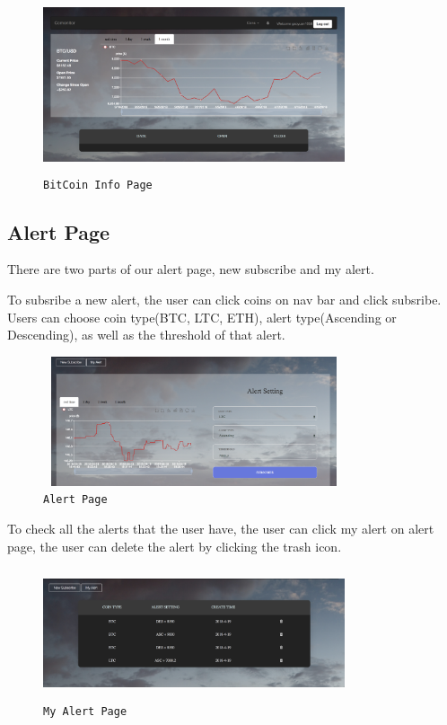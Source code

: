 \begin{figure}[!htb]
\includegraphics[height=2.0in, width=3.5in]{coinpage.png}
\caption{\texttt{BitCoin Info Page}}
\end{figure}

\subsection{Alert Page}
There are two parts of our alert page, new subscribe and my alert.

To subsribe a new alert, the user can click coins on nav bar and click subsribe. Users
can choose coin type(BTC, LTC, ETH), alert type(Ascending or Descending), as well as the 
threshold of that alert.

\begin{figure}[!htb]
\includegraphics[height=1.5in, width=3.5in]{alert.png}
\caption{\texttt{Alert Page}}
\end{figure}


To check all the alerts that the user have, the user can click my alert on alert page,
the user can delete the alert by clicking the trash icon.

\begin{figure}[!htb]
\includegraphics[height=1.5in, width=3.5in]{myalert.png}
\caption{\texttt{My Alert Page}}
\end{figure}

